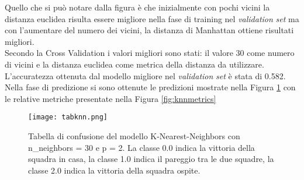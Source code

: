 Quello che si può notare dalla figura è che inizialmente con pochi vicini la distanza euclidea risulta essere migliore nella fase di training nel \emph{validation} \emph{set} ma con l'aumentare del numero dei vicini, la distanza di Manhattan ottiene risultati migliori. \\
Secondo la Cross Validation i valori migliori sono stati: il valore 30 come numero di vicini e la distanza euclidea come metrica della distanza da utilizzare. L'accuratezza ottenuta dal modello migliore nel \emph{validation} \emph{set} è stata di 0.582.\\
Nella fase di predizione si sono ottenute le predizioni mostrate nella Figura \ref{fig:knnpre} con le relative metriche presentate nella Figura \ref{fig:knnmetrics}

\begin{figure}[h]
	\begin{center}
		\texttt{[image: tabknn.png]}
		\caption{Tabella di confusione del modello K-Nearest-Neighbors con\textsf{ n\_neighbors} = 30 e \textsf{p} = 2. La classe 0.0 indica la vittoria della squadra in casa, la classe 1.0 indica il pareggio tra le due squadre, la classe 2.0 indica la vittoria della squadra ospite.
		} 
		\label{fig:knnpre}
	\end{center}
\end{figure}

